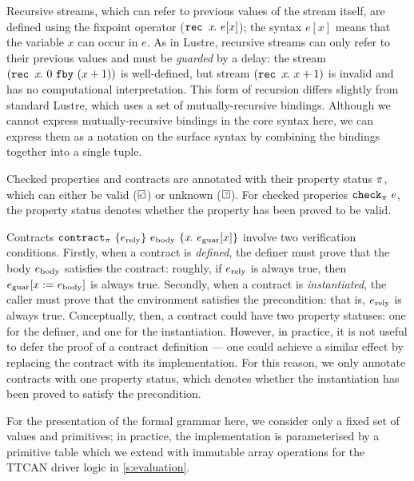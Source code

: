 Recursive streams, which can refer to previous values of the stream itself, are defined using the fixpoint operator ($\texttt{rec~} x\hspace{-0.1em}.~e[x]$); the syntax $e[x]$ means that the variable $x$ can occur in $e$.
As in Lustre, recursive streams can only refer to their previous values and must be \emph{guarded} by a delay: the stream $(\texttt{rec~} x\hspace{-0.1em}.~0~\texttt{fby}~(x + 1))$ is well-defined, but stream $(\texttt{rec~} x\hspace{-0.1em}.~x + 1)$ is invalid and has no computational interpretation.
This form of recursion differs slightly from standard Lustre, which uses a set of mutually-recursive bindings.
Although we cannot express mutually-recursive bindings in the core syntax here, we can express them as a notation on the surface syntax by combining the bindings together into a single tuple.

Checked properties and contracts are annotated with their property status $\pi$, which can either be valid ($\PSValid$) or unknown ($\PSUnknown$).
For checked properies $\texttt{check}_{\pi}~e$, the property status denotes whether the property has been proved to be valid.

Contracts $\texttt{contract}_{\pi}~\{e_{\text{rely}}\}~e_{\text{body}}~\{x\hspace{-0.1em}.~e_{\text{guar}}[x]\}$ involve two verification conditions.
Firstly, when a contract is \emph{defined}, the definer must prove that the body $e_{\text{body}}$ satisfies the contract: roughly, if $e_{\text{rely}}$ is always true, then $e_{\text{guar}}[x := e_{\text{body}}]$ is always true.
Secondly, when a contract is \emph{instantiated}, the caller must prove that the environment satisfies the precondition: that is, $e_{\text{rely}}$ is always true.
Conceptually, then, a contract could have two property statuses: one for the definer, and one for the instantiation.
However, in practice, it is not useful to defer the proof of a contract definition --- one could achieve a similar effect by replacing the contract with its implementation.
For this reason, we only annotate contracts with one property status, which denotes whether the instantiation has been proved to satisfy the precondition.

For the presentation of the formal grammar here, we consider only a fixed set of values and primitives; in practice, the implementation is parameterised by a primitive table which we extend with immutable array operations for the TTCAN driver logic in \autoref{s:evaluation}.

